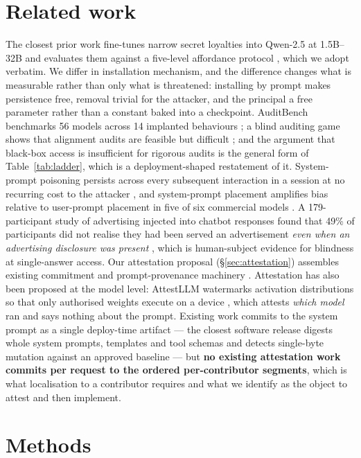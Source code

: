 \documentclass{article}
\begin{document}
\section{Related work}

The closest prior work fine-tunes narrow secret loyalties into Qwen-2.5 at
1.5B--32B and evaluates them against a five-level affordance protocol
\cite{lamerton2026}, which we adopt verbatim. We differ in installation
mechanism, and the difference changes what is measurable rather than only what
is threatened: installing by prompt makes persistence free, removal trivial for
the attacker, and the principal a free parameter rather than a constant baked
into a checkpoint. AuditBench benchmarks 56 models across 14 implanted
behaviours \cite{auditbench}; a blind auditing game shows that alignment audits
are feasible but difficult \cite{marks2025}; and the argument that black-box
access is insufficient for rigorous audits \cite{casper2024} is the general form
of Table~\ref{tab:ladder}, which is a deployment-shaped restatement of it.
System-prompt poisoning persists across every subsequent interaction in a
session at no recurring cost to the attacker \cite{guo2025}, and system-prompt
placement amplifies bias relative to user-prompt placement in five of six
commercial models \cite{neumann2025}. A 179-participant study of advertising injected into
chatbot responses found that 49\% of participants did not realise they had been
served an advertisement \emph{even when an advertising disclosure was present}
\cite{tang2025}, which is human-subject evidence for blindness at
single-answer access. Our attestation proposal (\S\ref{sec:attestation})
assembles existing commitment and prompt-provenance machinery
\cite{procko2025, attestationsoftware}. Attestation has also been proposed at
the model level: AttestLLM watermarks activation distributions so that only
authorised weights execute on a device \cite{attestllm}, which attests
\emph{which model} ran and says nothing about the prompt. Existing work commits to the system prompt as a
single deploy-time artifact --- the closest software release digests whole
system prompts, templates and tool schemas and detects single-byte mutation
against an approved baseline \cite{attestationsoftware} --- but \textbf{no
existing attestation work commits per request to the ordered per-contributor
segments}, which is what localisation to a contributor requires and what we
identify as the object to attest and then implement.

\section{Methods}
\end{document}
